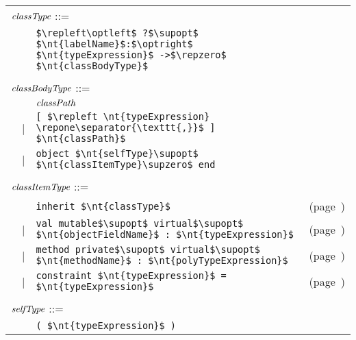 \begin{center}
\begin{tabular}{rcll}
\multicolumn{3}{l}{$\textit{\rmfamily classType}$ ::=}\\
&   & \hbox{\lstinline/$\repleft\optleft$ ?$\supopt$ $\nt{labelName}$:$\optright$ $\nt{typeExpression}$ ->$\repzero$ $\nt{classBodyType}$/}\\
\\
\multicolumn{3}{l}{$\textit{\rmfamily classBodyType}$ ::=}\\
&   & $\textit{\rmfamily classPath}$\\
& | & \hbox{\lstinline/[ $\repleft \nt{typeExpression} \repone\separator{\texttt{,}}$ ] $\nt{classPath}$/}\\
& | & \hbox{\lstinline/object $\nt{selfType}\supopt$ $\nt{classItemType}\supzero$ end/}\\
\\
\multicolumn{3}{l}{$\textit{\rmfamily classItemType}$ ::=}\\
&   & \hbox{\lstinline/inherit $\nt{classType}$/} & (page~\pageref{classes:type-inherit})\\
& | & \hbox{\lstinline/val mutable$\supopt$ virtual$\supopt$ $\nt{objectFieldName}$ : $\nt{typeExpression}$/} & (page~\pageref{keyword:val(objects)})\\
& | & \hbox{\lstinline/method private$\supopt$ virtual$\supopt$ $\nt{methodName}$ : $\nt{polyTypeExpression}$/} & (page~\pageref{classes:type-quantifier})\\
& | & \hbox{\lstinline/constraint $\nt{typeExpression}$ = $\nt{typeExpression}$/} & (page~\pageref{keyword:constraint})\\
\\
\multicolumn{3}{l}{$\textit{\rmfamily selfType}$ ::=}\\
&   & \hbox{\lstinline/( $\nt{typeExpression}$ )/}
\end{tabular}
\end{center}

